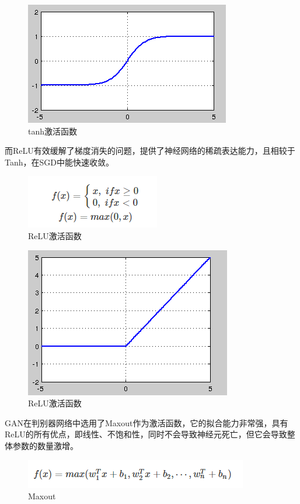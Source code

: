 \documentclass[
  hyperref, a4paper]{ctexart}
\begin{document}
\begin{figure}
\centering
\includegraphics{./13.jpg}
\caption{tanh激活函数}
\end{figure}

而ReLU有效缓解了梯度消失的问题，提供了神经网络的稀疏表达能力，且相较于Tanh，在SGD中能快速收敛。

\begin{figure}
\centering
\includegraphics{./14.png}
\caption{ReLU激活函数}
\end{figure}

\begin{figure}
\centering
\includegraphics{./15.jpg}
\caption{ReLU激活函数}
\end{figure}

GAN在判别器网络中选用了Maxout作为激活函数，它的拟合能力非常强，具有ReLU的所有优点，即线性、不饱和性，同时不会导致神经元死亡，但它会导致整体参数的数量激增。

\begin{figure}
\centering
\includegraphics{./16.png}
\caption{Maxout}
\end{figure}
\end{document}
